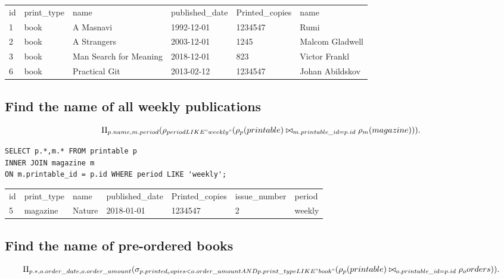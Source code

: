 \documentclass{article}
\begin{document}
\begin{table}[h]
\begin{tabular}{llllll}
id & print\_type & name                   & published\_date & Printed\_copies & name            \\
1  & book        & A Masnavi              & 1992-12-01      & 1234547         & Rumi            \\
2  & book        & A Strangers            & 2003-12-01      & 1245            & Malcom Gladwell \\
3  & book        & Man Search for Meaning & 2018-12-01      & 823             & Victor Frankl   \\
6  & book        & Practical Git          & 2013-02-12      & 1234547         & Johan Abildskov
\end{tabular}
\end{table}


\subsection{Find the name of all weekly publications}
\[

\Pi_{p.name, m.period}
(\rho_{period LIKE "weekly"}

  (\rho_p(printable) \bowtie_{m.printable\_id = p .id} \rho_m(magazine)))

.\]

\begin{lstlisting}[frame=single]
SELECT p.*,m.* FROM printable p 
INNER JOIN magazine m 
ON m.printable_id = p.id WHERE period LIKE 'weekly';
\end{lstlisting}

\begin{table}[h]
\begin{tabular}{lllllll}
id & print\_type & name   & published\_date & Printed\_copies & issue\_number & period  \\
5  & magazine    & Nature & 2018-01-01      & 1234547         & 2             & weekly             
\end{tabular}
\end{table}


\subsection{Find the name of pre-ordered books}
\[

\Pi_{p.*, o.order\_date, o.order\_amount}(

 \sigma_{p.printed_copies < o . order\_amount AND p . print\_type LIKE "book"}

  (\rho_p(printable)\bowtie_{o.printable\_id = p.id} \rho_o{orders}))
.\]
\end{document}
